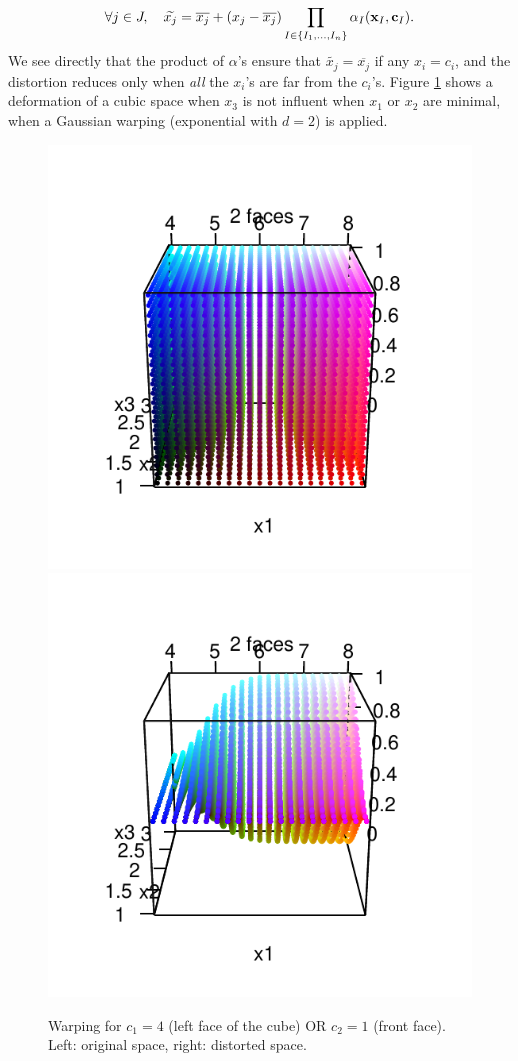 	\begin{equation}
	\forall j \in J, \quad \widetilde{x_j} = \overline{x_j} + \left( x_j - \overline{x_j}\right) \prod_{I \in \{I_1, \ldots, I_n \}}{\alpha_I}(\x_I, \cc_I)\label{eq:or0}. %
	\end{equation}
	We see directly that the product of $\alpha$'s ensure that $\widetilde{x_j} = \overline{x_j}$
	if any $x_i = c_i$, and the distortion reduces only when \emph{all} the $x_i$'s are far from the $c_i$'s.
	Figure \ref{fig:def3DORs} shows a deformation of a cubic space when $x_3$ is not influent when $x_1$ or $x_2$ are minimal, when a Gaussian warping (exponential with $d=2$) is applied.
	\begin{figure}[!ht]
		\centering
		\includegraphics[width=.4\textwidth]{def3DORs.pdf}
		\includegraphics[width=.4\textwidth]{def3DOR2s.pdf}
		\caption{Warping for $c_1=4$ (left face of the cube) OR $c_2=1$ (front face). Left: original space, right: distorted space. %
		}\label{fig:def3DORs}
	\end{figure}
	
